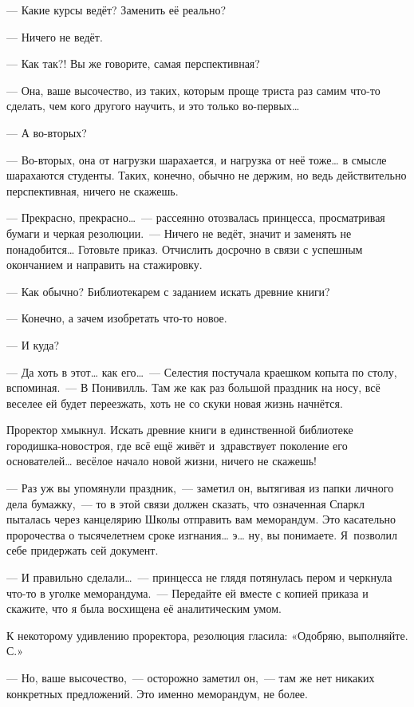 \documentclass[fontsize=11pt,a5paper,titlepage=firstcover]{scrbook}
\begin{document}
--- Какие курсы ведёт? Заменить её реально?

--- Ничего не ведёт.

--- Как так?! Вы же говорите, самая перспективная?

--- Она, ваше высочество, из таких, которым проще триста раз самим что-то сделать, чем кого другого научить, и это только во-первых{\ldots}

--- А во-вторых?

--- Во-вторых, она от нагрузки шарахается, и нагрузка от неё тоже{\ldots} в смысле шарахаются студенты. Таких, конечно, обычно не держим, но ведь действительно перспективная, ничего не скажешь.

--- Прекрасно, прекрасно{\ldots}~--- рассеянно отозвалась принцесса, просматривая бумаги и черкая резолюции.~--- Ничего не ведёт, значит и заменять не понадобится{\ldots} Готовьте приказ. Отчислить досрочно в связи с успешным окончанием и направить на стажировку.

--- Как обычно? Библиотекарем с заданием искать древние книги?

--- Конечно, а зачем изобретать что-то новое.

--- И куда?

--- Да хоть в этот{\ldots} как его{\ldots}~--- Селестия постучала краешком копыта по столу, вспоминая.~--- В Понивилль. Там же как раз большой праздник на носу, всё веселее ей будет переезжать, хоть не со скуки новая жизнь начнётся.

Проректор хмыкнул. Искать древние книги в единственной библиотеке городишка-новостроя, где всё ещё живёт и~здравствует поколение его основателей{\ldots} весёлое начало новой жизни, ничего не скажешь!

--- Раз уж вы упомянули праздник,~--- заметил он, вытягивая из папки личного дела бумажку,~--- то в этой связи должен сказать, что означенная Спаркл пыталась через канцелярию Школы отправить вам меморандум. Это касательно пророчества о тысячелетнем сроке изгнания{\ldots} э{\ldots} ну, вы понимаете. Я~позволил себе придержать сей документ.

--- И правильно сделали{\ldots}~--- принцесса не глядя потянулась пером и черкнула что-то в уголке меморандума.~--- Передайте ей вместе с копией приказа и скажите, что я была восхищена её аналитическим умом.

К некоторому удивлению проректора, резолюция гласила: «Одобряю, выполняйте. С.»

--- Но, ваше высочество,~--- осторожно заметил он,~--- там же нет никаких конкретных предложений. Это именно меморандум, не более.
\end{document}

